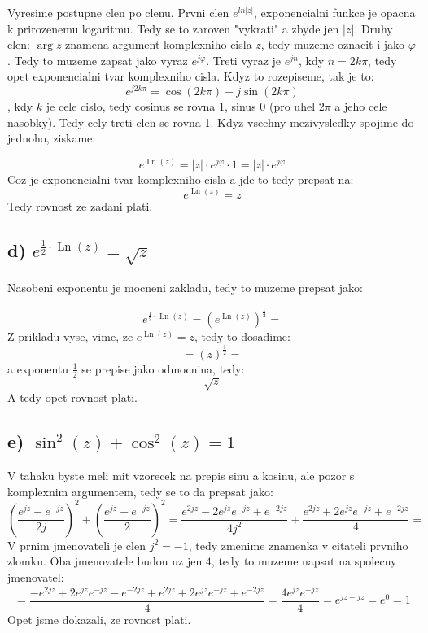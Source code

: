 Vyresime postupne clen po clenu. Prvni clen $e^{ln|z|}$, exponencialni funkce je opacna k prirozenemu logaritmu. Tedy se to zaroven "vykrati" a zbyde jen $|z|$. Druhy clen: $\operatorname{arg}z$ znamena argument komplexniho cisla $z$, tedy muzeme oznacit i jako $\varphi$.  Tedy to muzeme zapsat jako vyraz $e^{j\varphi}$. Treti vyraz je $e^{jn}$, kdy $n = 2k \pi$, tedy opet exponencialni tvar komplexniho cisla. Kdyz to rozepiseme, tak je to:
$$e^{j2k\pi} = \operatorname{cos}(2k\pi)+j \operatorname{sin}(2k\pi)$$,
kdy $k$ je cele cislo, tedy cosinus se rovna 1, sinus 0 (pro uhel $2\pi$ a jeho cele nasobky). Tedy cely treti clen se rovna 1. Kdyz vsechny mezivysledky spojime do jednoho, ziskame:

$$e^{\operatorname{Ln}(z)} = |z|\cdot e^{j\varphi} \cdot 1 = |z|\cdot e^{j\varphi}$$
Coz je exponencialni tvar komplexniho cisla a jde to tedy prepsat na:
$$e^{\operatorname{Ln}(z)} = z$$
Tedy rovnost ze zadani plati.

\subsection{d) $e^{\frac{1}{2}\cdot \operatorname{Ln}(z)} = \sqrt{z}$}

Nasobeni exponentu je mocneni zakladu, tedy to muzeme prepsat jako:

$$e^{\frac{1}{2}\cdot \operatorname{Ln}(z)} = \left( e^{\operatorname{Ln}(z)} \right)^\frac{1}{2} = $$
Z prikladu vyse, vime, ze $e^{\operatorname{Ln}(z)} = z$, tedy to dosadime:
$$= (z)^\frac{1}{2} = $$
a exponentu $\frac{1}{2}$ se prepise jako odmocnina, tedy:
$$ \sqrt{z}$$
A tedy opet rovnost plati.

\subsection{e) $\operatorname{sin}^2(z) + \operatorname{cos}^2(z) = 1$}

V tahaku byste meli mit vzorecek na prepis sinu a kosinu, ale pozor s komplexnim argumentem, tedy se to da prepsat jako:
$$\left( \frac{e^{jz}-e^{-jz}}{2j} \right)^2 + \left( \frac{e^{jz}+e^{-jz}}{2}\right)^2 = \frac{e^{2jz}-2e^{jz}e^{-jz}+e^{-2jz}}{4j^2}+\frac{e^{2jz}+2e^{jz}e^{-jz}+e^{-2jz}}{4}=$$
V prnim jmenovateli je clen $j^2 = -1$, tedy zmenime znamenka v citateli prvniho zlomku. Oba jmenovatele budou uz jen $4$, tedy to muzeme napsat na spolecny jmenovatel:
$$= \frac{-e^{2jz}+2e^{jz}e^{-jz}-e^{-2jz}+e^{2jz}+2e^{jz}e^{-jz}+e^{-2jz}}{4} = \frac{4e^{jz}e^{-jz}}{4} = e^{jz-jz} = e^0 = 1$$
Opet jsme dokazali, ze rovnost plati.

